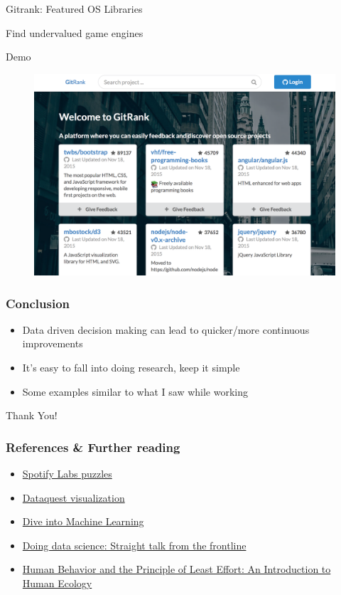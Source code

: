 \documentclass{beamer}
\begin{document}

\begin{frame}
	\centerline{Gitrank: Featured OS Libraries}
	\centerline{Find undervalued game engines}
	\Huge{\centerline{Demo}}
	\begin{figure}
		\centering
		\includegraphics[width=0.8\linewidth]{gitrank}
	\end{figure}
\end{frame}


\begin{frame}
	\frametitle{Conclusion}
	\begin{itemize}
		\item Data driven decision making can lead to quicker/more continuous improvements
		\item It's easy to fall into doing research, keep it simple
		\item Some examples similar to what I saw while working
	\end{itemize}
\end{frame}


\begin{frame}
	\Huge{\centerline{Thank You!}}
\end{frame}


\begin{frame}
	\frametitle{References \& Further reading}
	\begin{itemize}
		\item \href{https://labs.spotify.com/puzzles/}{Spotify Labs puzzles}
		\item \href{https://www.dataquest.io/blog/python-data-visualization-libraries/}{Dataquest visualization}
		\item \href{https://github.com/hangtwenty/dive-into-machine-learning/blob/master/README.md}{Dive into Machine Learning}
		\item \href{http://www.amazon.com/Doing-Data-Science-Straight-Frontline/dp/1449358659}{Doing data science: Straight talk from the frontline}
		\item \href{http://www.amazon.com/Human-Behavior-Principle-Least-Effort/dp/161427312X}{Human Behavior and the Principle of Least Effort: An Introduction to Human Ecology}
	\end{itemize}
\end{frame}
\end{document}
